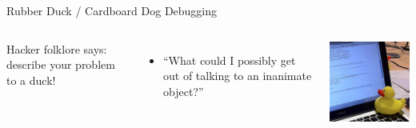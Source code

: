 \documentclass[xcolor=dvipsnames]{beamer}
\begin{document}
\begin{frame}{Rubber Duck / Cardboard Dog Debugging}
	\begin{columns}[l]
	Hacker folklore says: describe your problem to a duck!
	\begin{itemize}
		\item ``What could I possibly get out of talking to an inanimate object?''
	\end{itemize}
	\linegap

	\includegraphics[width=\textwidth]{rubberduck.jpg}
	\end{columns}
\end{frame}
\end{document}
